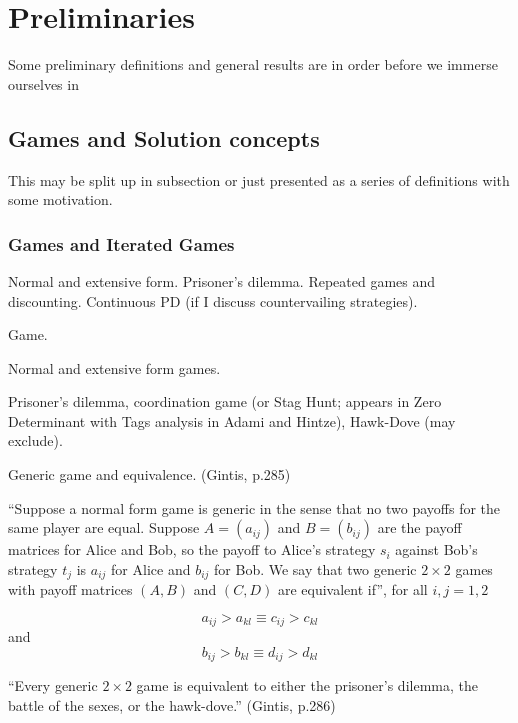 \chapter{Preliminaries}


Some preliminary definitions and general results are in order before we immerse ourselves in 


\section{Games and Solution concepts}
This may be split up in subsection or just presented as a series of definitions with some motivation.

\subsection{Games and Iterated Games}
Normal and extensive form. Prisoner's dilemma. Repeated games and discounting. Continuous PD (if I discuss countervailing strategies).

\begin{definition}
Game.
\end{definition}
\begin{definition}
Normal and extensive form games.
\end{definition}

\begin{example}
Prisoner's dilemma, coordination game (or Stag Hunt; appears in Zero Determinant with Tags analysis in Adami and Hintze), Hawk-Dove (may exclude).
\end{example}
\begin{definition}
Generic game and equivalence. (Gintis, p.285)

``Suppose a normal form game is generic in the sense that no two payoffs for the same player are equal. Suppose $A = (a_{ij})$ and $B = (b_{ij})$ are the payoff matrices for Alice and Bob, so the payoff to Alice's strategy $s_i$ against Bob's strategy $t_j$ is $a_{ij}$ for Alice and $b_{ij}$ for Bob. We say that two generic $2 \times 2$ games with payoff matrices $(A, B)$ and $(C, D)$ are equivalent if'', for all $i, j = 1, 2$

\[
a_{ij} > a_{kl} \equiv c_{ij} > c_{kl}
\]
and
\[
b_{ij} > b_{kl} \equiv d_{ij} > d_{kl}
\]


\end{definition}

\begin{proposition}
``Every generic $2 \times 2$ game is equivalent to either the prisoner's dilemma, the battle of the sexes, or the hawk-dove.'' (Gintis, p.286)
\end{proposition}

